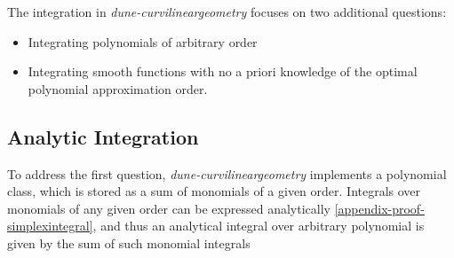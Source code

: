 
The integration in \textit{dune-curvilineargeometry} focuses on two additional questions:
\begin{itemize}
	\item Integrating polynomials of arbitrary order
	\item Integrating smooth functions with no a priori knowledge of the optimal polynomial approximation order.
\end{itemize}

\noindent
\subsection{Analytic Integration}
To address the first question, \textit{dune-curvilineargeometry} implements a polynomial class, which is stored as a sum of monomials of a given order. Integrals over monomials of any given order can be expressed analytically \cref{appendix-proof-simplexintegral}, and thus an analytical integral over arbitrary polynomial is given by the sum of such monomial integrals \\


